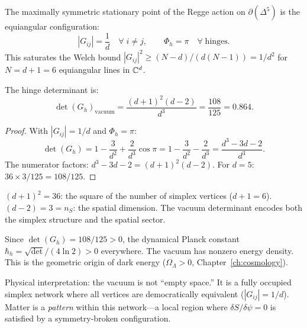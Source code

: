 \begin{theorem}
\label{thm:vacuum}
The maximally symmetric stationary point of the Regge action on $\partial(\Delta^5)$ is the equiangular configuration:
\begin{equation}
|G_{ij}| = \frac{1}{d} \quad \forall\; i \ne j, \qquad \Phi_h = \pi \quad \forall\;\text{hinges}.
\end{equation}
This saturates the Welch bound $|G_{ij}|^2 \ge (N-d)/(d(N-1)) = 1/d^2$ for $N = d+1 = 6$ equiangular lines in $\mathbb{C}^d$.

The hinge determinant is:
\begin{equation}
\boxed{\det(G_h)_{\mathrm{vacuum}} = \frac{(d+1)^2(d-2)}{d^3} = \frac{108}{125} = 0.864.}
\end{equation}
\end{theorem}

\begin{proof}
With $|G_{ij}| = 1/d$ and $\Phi_h = \pi$:
\begin{equation}
\det(G_h) = 1 - \frac{3}{d^2} + \frac{2}{d^3}\cos\pi = 1 - \frac{3}{d^2} - \frac{2}{d^3} = \frac{d^3 - 3d - 2}{d^3}.
\end{equation}
The numerator factors: $d^3 - 3d - 2 = (d+1)^2(d-2)$.  For $d = 5$: $36 \times 3 / 125 = 108/125$.
\end{proof}

\begin{remark}
$(d+1)^2 = 36$: the square of the number of simplex vertices ($d+1 = 6$).  $(d-2) = 3 = n_S$: the spatial dimension.  The vacuum determinant encodes both the simplex structure and the spatial sector.
\end{remark}

\begin{corollary}
Since $\det(G_h) = 108/125 > 0$, the dynamical Planck constant $\hbar_h = \sqrt{\det}/(4\ln 2) > 0$ everywhere.  The vacuum has nonzero energy density.  This is the geometric origin of dark energy ($\Omega_\Lambda > 0$, Chapter~\ref{ch:cosmology}).
\end{corollary}

Physical interpretation: the vacuum is not ``empty space.'' It is a fully occupied simplex network where all vertices are democratically equivalent ($|G_{ij}| = 1/d$).  Matter is a \emph{pattern} within this network---a local region where $\delta S/\delta\psi = 0$ is satisfied by a symmetry-broken configuration.
